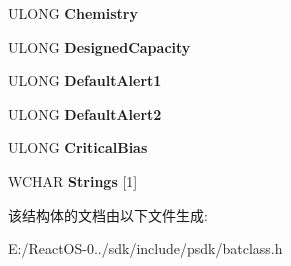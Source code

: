 \begin{DoxyCompactItemize}
U\+L\+O\+NG {\bfseries Chemistry}
\item 
\mbox{\label{struct___b_a_t_t_e_r_y___w_m_i___s_t_a_t_i_c___d_a_t_a_a739e5d435831d22d305d605eb96a4250}} 
U\+L\+O\+NG {\bfseries Designed\+Capacity}
\item 
\mbox{\label{struct___b_a_t_t_e_r_y___w_m_i___s_t_a_t_i_c___d_a_t_a_a7e6f2d4fa738c3242f6c1400d9441447}} 
U\+L\+O\+NG {\bfseries Default\+Alert1}
\item 
\mbox{\label{struct___b_a_t_t_e_r_y___w_m_i___s_t_a_t_i_c___d_a_t_a_a3a93525d6f19d059a2ecd84031b25e1f}} 
U\+L\+O\+NG {\bfseries Default\+Alert2}
\item 
\mbox{\label{struct___b_a_t_t_e_r_y___w_m_i___s_t_a_t_i_c___d_a_t_a_a532ba724407898f2c71019d8f2b7ddb2}} 
U\+L\+O\+NG {\bfseries Critical\+Bias}
\item 
\mbox{\label{struct___b_a_t_t_e_r_y___w_m_i___s_t_a_t_i_c___d_a_t_a_ac579ebb67f464d1c3d28789fc005cf0d}} 
W\+C\+H\+AR {\bfseries Strings} \mbox{[}1\mbox{]}
\end{DoxyCompactItemize}


该结构体的文档由以下文件生成\+:\begin{DoxyCompactItemize}
\item 
E\+:/\+React\+O\+S-\/0../sdk/include/psdk/batclass.\+h\end{DoxyCompactItemize}
